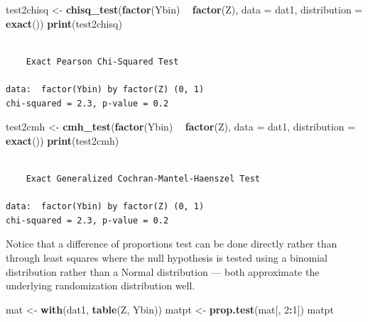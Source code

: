 \documentclass[
  12pt,
]{book}
\newenvironment{Shaded}{\begin{snugshade}}{\end{snugshade}}
\newcommand{\DataTypeTok}[1]{\textcolor[rgb]{0.13,0.29,0.53}{#1}}
\newcommand{\DecValTok}[1]{\textcolor[rgb]{0.00,0.00,0.81}{#1}}
\newcommand{\KeywordTok}[1]{\textcolor[rgb]{0.13,0.29,0.53}{\textbf{#1}}}
\newcommand{\NormalTok}[1]{#1}
\newcommand{\OperatorTok}[1]{\textcolor[rgb]{0.81,0.36,0.00}{\textbf{#1}}}
\newcommand{\StringTok}[1]{\textcolor[rgb]{0.31,0.60,0.02}{#1}}
\theoremstyle{definition}
\theoremstyle{definition}
\theoremstyle{definition}
\theoremstyle{remark}
\begin{document}
\begin{Shaded}
\begin{Highlighting}[]
\NormalTok{test2chisq <-}\StringTok{ }\KeywordTok{chisq_test}\NormalTok{(}\KeywordTok{factor}\NormalTok{(Ybin) }\OperatorTok{~}\StringTok{ }\KeywordTok{factor}\NormalTok{(Z), }\DataTypeTok{data =}\NormalTok{ dat1, }\DataTypeTok{distribution =} \KeywordTok{exact}\NormalTok{())}
\KeywordTok{print}\NormalTok{(test2chisq)}
\end{Highlighting}
\end{Shaded}

\begin{verbatim}

    Exact Pearson Chi-Squared Test

data:  factor(Ybin) by factor(Z) (0, 1)
chi-squared = 2.3, p-value = 0.2
\end{verbatim}

\begin{Shaded}
\begin{Highlighting}[]
\NormalTok{test2cmh <-}\StringTok{ }\KeywordTok{cmh_test}\NormalTok{(}\KeywordTok{factor}\NormalTok{(Ybin) }\OperatorTok{~}\StringTok{ }\KeywordTok{factor}\NormalTok{(Z), }\DataTypeTok{data =}\NormalTok{ dat1, }\DataTypeTok{distribution =} \KeywordTok{exact}\NormalTok{())}
\KeywordTok{print}\NormalTok{(test2cmh)}
\end{Highlighting}
\end{Shaded}

\begin{verbatim}

    Exact Generalized Cochran-Mantel-Haenszel Test

data:  factor(Ybin) by factor(Z) (0, 1)
chi-squared = 2.3, p-value = 0.2
\end{verbatim}

Notice that a difference of proportions test can be done directly rather
than through least squares where the null hypothesis is tested using a
binomial distribution rather than a Normal distribution --- both
approximate the underlying randomization distribution well.

\begin{Shaded}
\begin{Highlighting}[]
\NormalTok{mat <-}\StringTok{ }\KeywordTok{with}\NormalTok{(dat1, }\KeywordTok{table}\NormalTok{(Z, Ybin))}
\NormalTok{matpt <-}\StringTok{ }\KeywordTok{prop.test}\NormalTok{(mat[, }\DecValTok{2}\OperatorTok{:}\DecValTok{1}\NormalTok{])}
\NormalTok{matpt}
\end{Highlighting}
\end{Shaded}
\end{document}
